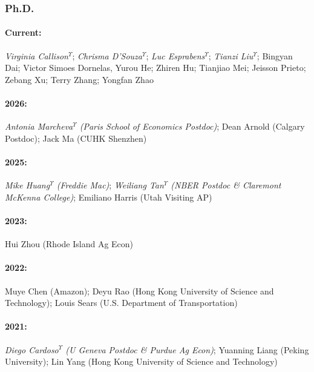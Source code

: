 \documentclass[11pt]{res} %
\begin{document}
\begin{resume}
\subsubsection{Ph.D.}\vspace{-.2in}
\paragraph{Current:} \textit{Virginia Callison}$^\Upsilon$; \textit{Chrisma D'Souza}$^\Upsilon$; \textit{Luc Esprabens}$^\Upsilon$; \textit{Tianzi Liu}$^\Upsilon$; Bingyan Dai; Victor Simoes Dornelas, Yurou He; Zhiren Hu; Tianjiao Mei; Jeisson Prieto; Zebang Xu; Terry Zhang; Yongfan Zhao
\vspace{-.35in}
\paragraph{2026:} \textit{Antonia Marcheva$^\Upsilon$ (Paris School of Economics Postdoc)}; Dean Arnold (Calgary Postdoc); Jack Ma (CUHK Shenzhen)
\vspace{-.35in}
\paragraph{2025:} \textit{{Mike Huang}$^\Upsilon$ (Freddie Mac)}; \textit{Weiliang Tan$^\Upsilon$ (NBER Postdoc \& Claremont McKenna College)}; Emiliano Harris (Utah Visiting AP)
\vspace{-.35in}
\paragraph{2023:} Hui Zhou (Rhode Island Ag Econ)
\vspace{-.35in}
\paragraph{2022:} Muye Chen (Amazon); Deyu Rao (Hong Kong University of Science and Technology); Louis Sears (U.S. Department of Transportation)
\vspace{-.35in}
\paragraph{2021:} \textit{Diego Cardoso$^\Upsilon$ (U Geneva Postdoc \& Purdue Ag Econ)}; Yuanning Liang (Peking University); Lin Yang (Hong Kong University of Science and Technology)

\vspace{-.2in}
 

\end{resume}
\end{document}
